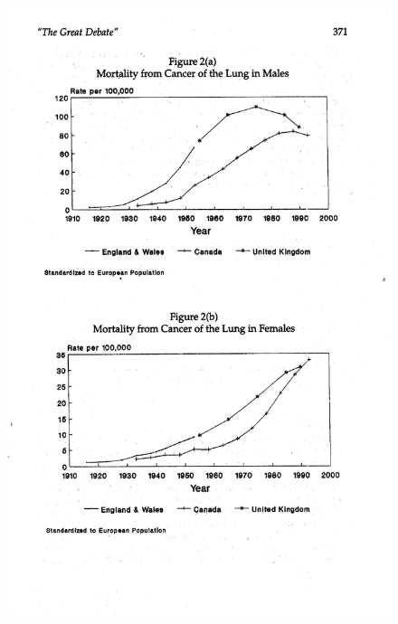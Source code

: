 \documentclass[notes=show]{beamer}
\begin{document}
\begin{frame}[plain, shrink=20]
	\begin{figure}
	\includegraphics[scale=0.75]{./lecture_includes/cancer_fig2.pdf}
	\end{figure}

\end{frame}	
\end{document}
